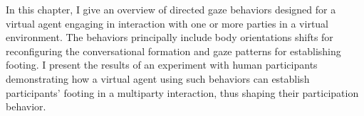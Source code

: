 In this chapter, I give an overview of directed gaze behaviors designed for a virtual agent engaging in interaction with one or more parties in a virtual environment. The behaviors principally include body orientations shifts for reconfiguring the conversational formation and gaze patterns for establishing footing. I present the results of an experiment with human participants demonstrating how a virtual agent using such behaviors can establish participants' footing in a multiparty interaction, thus shaping their participation behavior.
